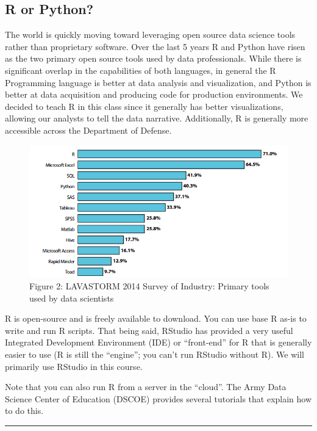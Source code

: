 \documentclass[]{book}
\begin{document}
\subsection{R or Python?}\label{r-or-python}

The world is quickly moving toward leveraging open source data science
tools rather than proprietary software. Over the last 5 years R and
Python have risen as the two primary open source tools used by data
professionals. While there is significant overlap in the capabilities of
both languages, in general the R Programming language is better at data
analysis and visualization, and Python is better at data acquisition and
producing code for production environments. We decided to teach R in
this class since it generally has better visualizations, allowing our
analysts to tell the data narrative. Additionally, R is generally more
accessible across the Department of Defense.

\begin{figure}[htbp]
\centering
\includegraphics{whyR2.PNG}
\caption{Figure 2: LAVASTORM 2014 Survey of Industry: Primary tools used
by data scientists}
\end{figure}

R is open-source and is freely available to download. You can use base R
as-is to write and run R scripts. That being said, RStudio has provided
a very useful Integrated Development Environment (IDE) or ``front-end''
for R that is generally easier to use (R is still the ``engine''; you
can't run RStudio without R). We will primarily use RStudio in this
course.

Note that you can also run R from a server in the ``cloud''. The Army
Data Science Center of Education (DSCOE) provides several tutorials that
explain how to do this.

\begin{center}\rule{0.5\linewidth}{\linethickness}\end{center}
\end{document}
